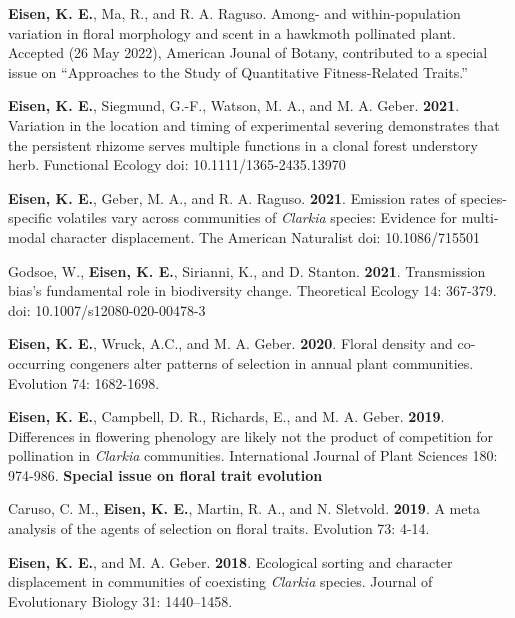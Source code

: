 \documentclass[letterpaper,11pt]{article}
\begin{document}
\begin{etaremune}
\item\textbf{Eisen, K. E.}, Ma, R., and R. A. Raguso.  Among- and within-population variation in floral morphology and scent in a hawkmoth pollinated plant. Accepted (26 May 2022), American Jounal of Botany, contributed to a special issue on ``Approaches to the Study of Quantitative Fitness-Related Traits.'' 

\item \textbf{Eisen, K. E.}, Siegmund, G.-F., Watson, M. A., and M. A. Geber. \textbf{2021}. Variation in the location and timing of experimental severing demonstrates that the persistent rhizome serves multiple functions in a clonal forest understory herb. Functional Ecology doi: 10.1111/1365-2435.13970\\
\item \textbf{Eisen, K. E.}, Geber, M. A., and R. A. Raguso. \textbf{2021}. Emission rates of species-specific volatiles vary across communities of \textit{Clarkia} species: Evidence for multi-modal character displacement. The American Naturalist doi: 10.1086/715501\\
\item Godsoe, W., \textbf{Eisen, K. E.}, Sirianni, K., and D. Stanton. \textbf{2021}. Transmission bias's fundamental role in biodiversity change. Theoretical Ecology 14: 367-379. doi: 10.1007/s12080-020-00478-3 \\
\item \textbf{Eisen, K. E.}, Wruck, A.C., and M. A. Geber. \textbf{2020}. Floral density and co-occurring congeners alter patterns of selection in annual plant communities. Evolution 74: 1682-1698. \\
\item \textbf{Eisen, K. E.}, Campbell, D. R., Richards, E., and M. A. Geber. \textbf{2019}. Differences in flowering phenology are likely not the product of competition for pollination in \textit{Clarkia} communities. International Journal of Plant Sciences 180: 974-986. \textbf{Special issue on floral trait evolution}\\
\item Caruso, C. M., \textbf{Eisen, K. E.}, Martin, R. A., and N. Sletvold. \textbf{2019}. A meta analysis of the agents of selection on floral traits. Evolution 73: 4-14.\\
\item \textbf{Eisen, K. E.}, and M. A. Geber. \textbf{2018}. Ecological sorting and character displacement in communities of coexisting \textit{Clarkia} species. Journal of Evolutionary Biology 31: 1440–1458.\\


\end{etaremune}
\end{document}
